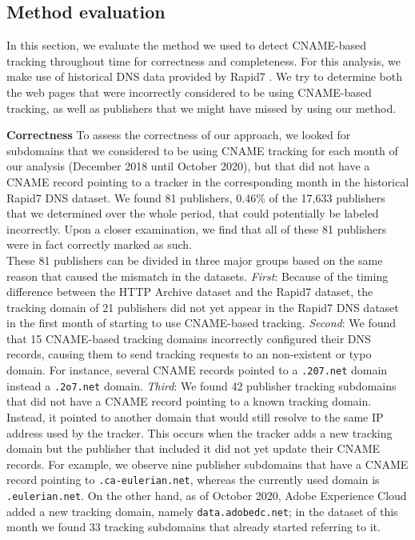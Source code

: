 \subsection{Method evaluation}
\label{sec:method_validation}
In this section, we evaluate the method we used to detect CNAME-based tracking throughout time for correctness and completeness.
For this analysis, we make use of historical DNS data provided by Rapid7  \cite{rapid7fdns}. 
We try to determine both the web pages that were incorrectly considered to be using CNAME-based tracking, as well as publishers that we might have missed by using our method.

\textbf{Correctness}
To assess the correctness of our approach, we looked for subdomains that we considered to be using CNAME tracking for each month of our analysis (December 2018 until October 2020), but that did not have a CNAME record pointing to a tracker in the corresponding month in the historical Rapid7 DNS dataset.
We found 81 publishers, 0.46\% of the 17,633 publishers that we determined over the whole period, that could potentially be labeled incorrectly.
Upon a closer examination, we find that all of these 81 publishers were in fact correctly marked as such.\\
These 81 publishers can be divided in three major groups based on the same reason that caused the mismatch in the datasets.
\textit{First}: Because of the timing difference between the HTTP Archive dataset and the Rapid7 dataset, the tracking domain of 21 publishers did not yet appear in the Rapid7 DNS dataset in the first month of starting to use CNAME-based tracking.
\textit{Second}: We found that 15 CNAME-based tracking domains incorrectly configured their DNS records, causing them to send tracking requests to an non-existent or typo domain.
For instance, several CNAME records pointed to a \texttt{.207.net} domain instead a \texttt{.2o7.net} domain.
\textit{Third}: We found 42 publisher tracking subdomains that did not have a CNAME record pointing to a known tracking domain. Instead, it pointed to another domain that would still resolve to the same IP address used by the tracker.
This occurs when the tracker adds a new tracking domain but the publisher that included it did not yet update their CNAME records.
For example, we observe nine publisher subdomains that have a CNAME record pointing to \texttt{.ca-eulerian.net}, whereas the currently used domain is \texttt{.eulerian.net}.
On the other hand, as of October 2020, Adobe Experience Cloud added a new tracking domain, namely \texttt{data.adobedc.net}; in the dataset of this month we found 33 tracking subdomains that already started referring to it.
